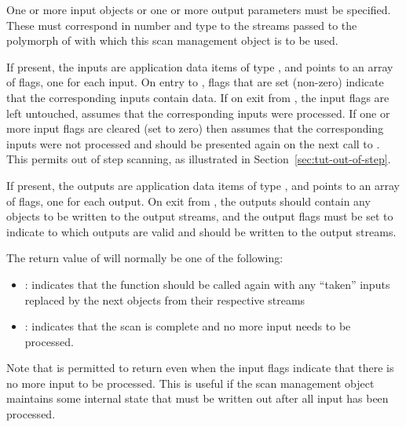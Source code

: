     One or more input objects or one or more output
    parameters must be specified.  These must correspond in
    number and type to the streams passed to the polymorph
    of  with which this scan management
    object is to be used.
    
    If present, the inputs  are application
    data items of type , and  points
    to an array of flags, one for each input.  On entry to
    , flags that are set (non-zero)
    indicate that the corresponding inputs contain data.  If
    on exit from , the input flags are
    left untouched,  assumes that the
    corresponding inputs were processed.  If one or more
    input flags are cleared (set to zero) then
     assumes that the corresponding
    inputs were not processed and should be presented again
    on the next call to .  This permits
    out of step scanning, as
    illustrated in Section~\ref{sec:tut-out-of-step}.
    
    If present, the outputs  are
    application data items of type , and
     points to an array of flags, one for each
    output. On exit from , the outputs
    should contain any objects to be written to the output
    streams, and the output flags must be set to indicate to
     which outputs are valid and should
    be written to the output streams.
    
    The return value of  will normally be
    one of the following:
    \begin{itemize}
        \item {}:
         indicates that
        the function should be called again with any
        ``taken'' inputs replaced by the next objects from
        their respective streams
        \item {}: 
        indicates that the
        scan is complete and no more input needs to be
        processed.
    \end{itemize}
    
    Note that  is permitted to return
     even when the input flags
    indicate that there is no more input to be processed.
    This is useful if the scan management object maintains
    some internal state that must be written out after all
    input has been processed.  

